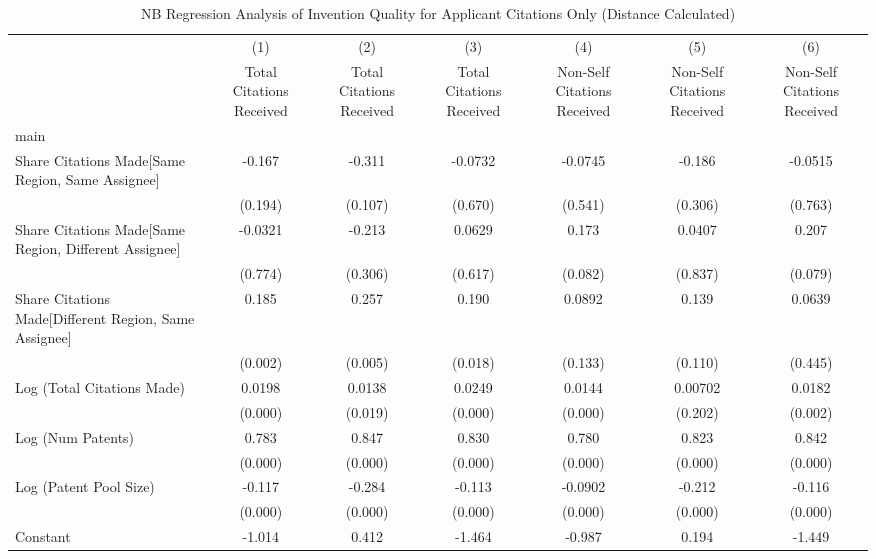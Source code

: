 \begin{table}[htbp]\centering
\caption{NB Regression Analysis of Invention Quality for Applicant Citations Only (Distance Calculated) \label{a.model123192021}}
\begin{tabular}{l*{6}{c}}
\hline\hline
                &\multicolumn{1}{c}{(1)}&\multicolumn{1}{c}{(2)}&\multicolumn{1}{c}{(3)}&\multicolumn{1}{c}{(4)}&\multicolumn{1}{c}{(5)}&\multicolumn{1}{c}{(6)}\\
                &\multicolumn{1}{c}{Total Citations Received}&\multicolumn{1}{c}{Total Citations Received}&\multicolumn{1}{c}{Total Citations Received}&\multicolumn{1}{c}{Non-Self Citations Received}&\multicolumn{1}{c}{Non-Self Citations Received}&\multicolumn{1}{c}{Non-Self Citations Received}\\
\hline
main            &         &         &         &         &         &         \\
Share Citations Made[Same Region, Same Assignee]&   -0.167&   -0.311&  -0.0732&  -0.0745&   -0.186&  -0.0515\\
                &  (0.194)&  (0.107)&  (0.670)&  (0.541)&  (0.306)&  (0.763)\\
Share Citations Made[Same Region, Different Assignee]&  -0.0321&   -0.213&   0.0629&    0.173&   0.0407&    0.207\\
                &  (0.774)&  (0.306)&  (0.617)&  (0.082)&  (0.837)&  (0.079)\\
Share Citations Made[Different Region, Same Assignee]&    0.185&    0.257&    0.190&   0.0892&    0.139&   0.0639\\
                &  (0.002)&  (0.005)&  (0.018)&  (0.133)&  (0.110)&  (0.445)\\
Log (Total Citations Made)&   0.0198&   0.0138&   0.0249&   0.0144&  0.00702&   0.0182\\
                &  (0.000)&  (0.019)&  (0.000)&  (0.000)&  (0.202)&  (0.002)\\
Log (Num Patents)&    0.783&    0.847&    0.830&    0.780&    0.823&    0.842\\
                &  (0.000)&  (0.000)&  (0.000)&  (0.000)&  (0.000)&  (0.000)\\
Log (Patent Pool Size)&   -0.117&   -0.284&   -0.113&  -0.0902&   -0.212&   -0.116\\
                &  (0.000)&  (0.000)&  (0.000)&  (0.000)&  (0.000)&  (0.000)\\
Constant        &   -1.014&    0.412&   -1.464&   -0.987&    0.194&   -1.449\\

\end{tabular}
\end{table}
